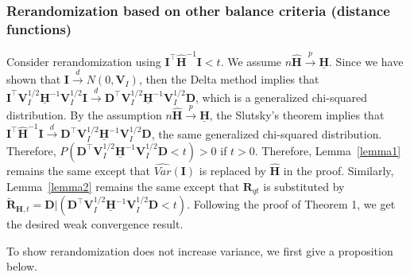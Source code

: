 \documentclass[12pt]{article}
\newcommand{\bI}{\boldsymbol{I}}
\newcommand{\bR}{\boldsymbol{R}}
\newcommand{\bD}{\boldsymbol{D}}
\newcommand{\bfV}{\mathbf{V}}
\newcommand{\bfH}{\mathbf{H}}
\begin{document}
\subsubsection{Rerandomization based on other balance criteria (distance functions)}
Consider rerandomization using $\bI^\top \widehat{\bfH}^{-1} \bI < t$. We assume $n\widehat{\bfH} \xrightarrow{p} \underline{\bfH}$. 
Since we have shown that $\bI \xrightarrow{d} N(0,\bfV_I)$, then the Delta method implies that $\bI^\top \bfV_{I}^{1/2}\underline{\bfH}^{-1} \bfV_{I}^{1/2}\bI \xrightarrow{d} \bD^\top \bfV_{I}^{1/2} \underline{\bfH}^{-1} \bfV_{I}^{1/2}\bD$, which is a generalized chi-squared distribution. By the assumption $n\widehat{\bfH} \xrightarrow{p} \underline{\bfH}$, the Slutsky's theorem implies that $\bI^\top \widehat{\bfH}^{-1} \bI \xrightarrow{d} \bD^\top \bfV_{I}^{1/2} \underline{\bfH}^{-1} \bfV_{I}^{1/2}\bD$, the same generalized chi-squared distribution. Therefore, $P(\bD^\top \bfV_{I}^{1/2} \underline{\bfH}^{-1} \bfV_{I}^{1/2}\bD < t) > 0$ if $t > 0$. Therefore, Lemma~\ref{lemma1} remains the same except that $\widehat{Var}(\bI)$ is replaced by $\widehat{\bfH}$ in the proof. Similarly, Lemma~\ref{lemma2} remains the same except that $\bR_{qt}$ is substituted by $\widetilde{\bR}_{\bfH,t} = \bD|(\bD^\top\bfV_{I}^{1/2} \underline{\bfH}^{-1} \bfV_{I}^{1/2}\bD <t)$. Following the proof of Theorem 1, we get the desired weak convergence result. 

To show rerandomization does not increase variance, we first give a proposition below.
\end{document}
